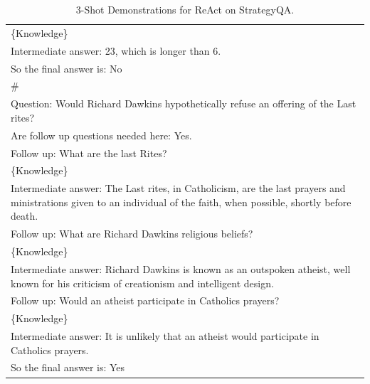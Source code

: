 \begin{table}[t!]
{\begin{tabular}{p{\textwidth}}
\{Knowledge\}\\
Intermediate answer: 23, which is longer than 6.\\
So the final answer is: No\\
\#\\
Question: Would Richard Dawkins hypothetically refuse an offering of the Last rites?\\
Are follow up questions needed here: Yes.\\
Follow up: What are the last Rites?\\
\{Knowledge\}\\
Intermediate answer: The Last rites, in Catholicism, are the last prayers and ministrations given to an individual of the faith, when possible, shortly before death.\\
Follow up: What are Richard Dawkins religious beliefs?\\
\{Knowledge\}\\
Intermediate answer: Richard Dawkins is known as an outspoken atheist, well known for his criticism of creationism and intelligent design.\\
Follow up: Would an atheist participate in Catholics prayers?\\
\{Knowledge\}\\
Intermediate answer: It is unlikely that an atheist would participate in Catholics prayers.\\
So the final answer is: Yes\\
\bottomrule
\end{tabular}
}
\caption{3-Shot Demonstrations for ReAct on StrategyQA.}\label{tab:StrategyQA-react}
\end{table}
\endgroup

